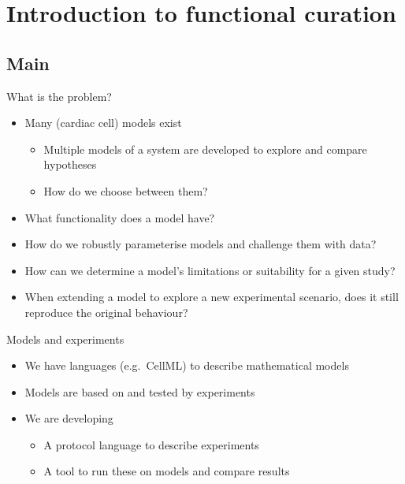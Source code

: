 \documentclass[t,xcolor={usenames,dvipsnames}]{beamer}
\begin{document}
\section{Introduction to functional curation}
\subsection*{Main}

\begin{frame}{What is the problem?}
\begin{itemize}
\item Many (cardiac cell) models exist
  \begin{itemize}
  \item Multiple models of a system are developed to explore and compare hypotheses
  \item How do we choose between them?
  \end{itemize}
\item What functionality does a model have?
\item How do we robustly parameterise models and challenge them with data?
\item How can we determine a model's limitations or suitability for a given study?
\item When extending a model to explore a new experimental scenario, does it still reproduce the original behaviour?
\end{itemize}
\end{frame}

\begin{frame}{Models and experiments}
\begin{itemize}
\item We have languages (e.g.\ CellML) to describe mathematical models
\item Models are based on and tested by \alert{experiments}
\item We are developing
  \begin{itemize}
  \item A \alert{protocol language} to describe experiments
  \item A tool to run these on models and compare results
  \end{itemize}
\end{itemize}
\end{frame}
\end{document}
